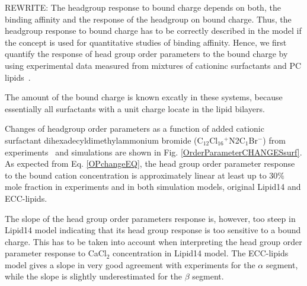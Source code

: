 \documentclass[aip,jcp,twocolumn]{revtex4}
\begin{document}
REWRITE:
The headgroup response to bound charge depends on both, the
binding affinity and the response of the headgroup on bound charge.
Thus, the headgroup response to bound charge has to be correctly
described in the model if the concept is used for quantitative studies of
binding affinity. Hence, we first quantify the response of head group order
parameters to the bound charge by using experimental data measured from
mixtures of cationinc surfactants and PC lipids~\cite{scherer89}.

The amount of the bound charge is known excatly in these systems,
because essentially all surfactants with a unit charge locate in the lipid bilayers.

Changes of headgroup order parameters as a function of added cationic surfactant
dihexadecyldimethylammonium bromide (C$_{12}$Cl$_{16}$$^+$N2C$_1$Br$^-$) from
experiments~\cite{scherer89} and simulations are shown in
Fig. \ref{OrderParameterCHANGESsurf}.
As expected from Eq. \ref{OPchangeEQ}, the head group order parameter response to the bound cation concentration
is approximately linear at least up to $30\%$ mole fraction in experiments and
in both simulation models, original Lipid14 and ECC-lipids.  

The slope of the head group order parameters response is, however, 
too steep in Lipid14 model indicating that 
its head group response is too sensitive to a bound charge. 
This has to be taken into account when interpreting the
head group order parameter response to CaCl$_2$ concentration in Lipid14 model.
The ECC-lipids model gives a slope in very good agreement with experiments
for the $\alpha$ segment, while the slope is slightly
underestimated for the $\beta$ segment.
\end{document}
